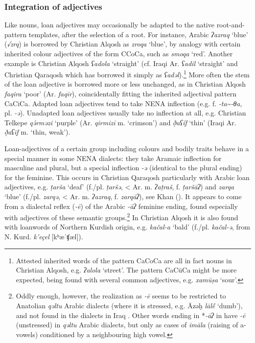 \documentclass[output=paper]{langsci/langscibook}
\begin{document}
\subsubsection{Integration of adjectives}

Like nouns, loan adjectives may occasionally be adapted to the native root-and-pattern templates, after the selection of a root. For instance, Arabic \textit{ʔazraq} ‘blue’ (\textit{√zrq}) is borrowed by Christian Alqosh as \textit{zroqa} ‘blue’, by analogy with certain inherited colour adjectives of the form CCoCa, such as \textit{smoqa} ‘red’. Another example is Christian Alqosh \textit{ʕadola} ‘straight’ (cf. Iraqi Ar. \textit{ʕadil} ‘straight’ and Christian Qaraqosh which has borrowed it simply as \textit{ʕadəl}).\footnote{Attested inherited words of the pattern CaCoCa are all in fact nouns in Christian Alqosh, e.g. \textit{ʔalola} ‘street’. The pattern CaCūCa might be more expected, being found with several common adjectives, e.g. \textit{xamūṣa} ‘sour’.} More often the stem of the loan adjective is borrowed more or less unchanged, as in Christian Alqosh \textit{faqira} ‘poor’ (Ar. \textit{faqīr}), coincidentally fitting the inherited adjectival pattern CaCiCa. Adapted loan adjectives tend to take NENA inflection (e.g. f. \textit{{}-ta{\textasciitilde}-θa}, pl. \textit{{}-ə}). Unadapted loan adjectives usually take no inflection at all, e.g. Christian Telkepe \textit{qə́rməzi} ‘purple’ (Ar. \textit{qirmizī} m. ‘crimson’) and \textit{ð̣aʕíf} ‘thin’ (Iraqi Ar. \textit{ð̣aʕīf} m. ‘thin, weak’).

Loan-adjectives of a certain group including colours and bodily traits behave in a special manner in some NENA dialects: they take Aramaic inflection for masculine and plural, but a special inflection \textit{\nobreakdash-ə} (identical to the plural ending) for the feminine. This occurs in Christian Qaraqosh particularly with Arabic loan adjectives, e.g. \textit{ṭarša} ‘deaf’ (f./pl. \textit{ṭaršə}, < Ar. m. \textit{ʔaṭraš}, f. \textit{ṭaršāʔ}) and \textit{zarqa} ‘blue’ (f./pl. \textit{zarqə}, < Ar. m. \textit{ʔazraq}, f. \textit{zarqāʔ}), see Khan (\citeyear[219]{Khan2002}). It appears to come from a dialectal reflex (\textit{\nobreakdash-ē}) of the Arabic \textit{\nobreakdash-āʔ} feminine ending, found especially with adjectives of these semantic groups.\footnote{Oddly enough, however, the realization as \textit{-ē} seems to be restricted to Anatolian \textit{qəltu} Arabic dialects (where it is stressed, e.g. Āzəḫ \textit{lāl\'{ē}} ‘dumb’), and not found in the dialects in Iraq \citep[76]{Jastrow1978}. Other words ending in *\textit{{}-āʔ} in have \textit{{}-ē} (unstressed) in \textit{qəltu} Arabic dialects, but only as cases of \textit{imāla} (raising of a-vowels) conditioned by a neighbouring high vowel.}  In Christian Alqosh it is also found with loanwords of Northern Kurdish origin, e.g. \textit{kačal-a} ‘bald’ (f./pl. \textit{kačal\nobreakdash-ə}, from N. Kurd. \textit{k’eçel} [kʰæˈʧæl]).
\end{document}
